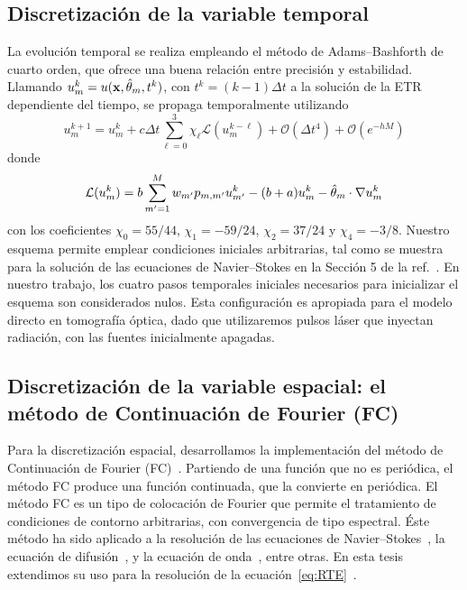 \subsection{Discretización de la variable temporal}
\label{sec:adamsbashforth}
La evolución temporal se realiza empleando el método de Adams--Bashforth de cuarto orden, 
que ofrece una 
buena relación entre precisión y estabilidad.
Llamando $u_m^k=u(\mathbf{x},\hat{\theta}_m,t^k)$, con $t^{k}=(k-1)\Delta t$ a la solución 
de la ETR 
dependiente del tiempo, se propaga temporalmente utilizando
\begin{equation}
u_m^{k+1} =  u_m^k + c\Delta t \sum_{\ell=0}^3 \chi_{\ell} \mathcal{L} ( u^{k-\ell}_m)  
+\mathcal{O}(\Delta t^4)+\mathcal{O}(e^{-hM})
\label{eq:RTEAB4}
\end{equation}
donde
\begin{equation}
\mathcal{L} ( u_m^k) = b\sum_{m'=1}^{M} w_{m'} p_{m,m'} u_{m'}^k-(b+a)u_m^k-\hat{\theta}_m \cdot \nabla u_m^k \notag
\label{eq:RTEAB4L}
\end{equation}
con los coeficientes $\chi_0=55/44$, 
$\chi_1=-59/24$, $\chi_2=37/24$ y $\chi_4=-3/8$. 
Nuestro esquema permite emplear condiciones iniciales arbitrarias, tal como se muestra para  
la solución de las ecuaciones de Navier--Stokes en la Sección 5 de la ref.~\cite{Bruno2016}.
En nuestro trabajo, los cuatro pasos temporales iniciales necesarios para inicializar 
el esquema son considerados nulos. Esta configuración es 
apropiada para 
el modelo directo en tomografía óptica, dado que utilizaremos pulsos láser 
que inyectan radiación, con las fuentes inicialmente apagadas. 

\subsection{Discretización de la variable espacial: el método de Continuación de Fourier (FC)}
\label{sec:fcmethod}
Para la discretización espacial, desarrollamos la implementación 
del método de Continuación de Fourier (FC)~\cite{Bruno2010,Albin2011,Amlani2016}.  
Partiendo de una función que no es periódica, el método FC produce 
una función continuada, que la convierte en periódica. 
El método FC es un tipo de colocación de Fourier que permite 
el tratamiento de condiciones de contorno arbitrarias, con 
convergencia de tipo espectral.
Éste método ha sido aplicado 
a la resolución de las ecuaciones de Navier--Stokes~\cite{Albin2011,Bruno2019}, la ecuación de difusión~\cite{Bruno2010}, 
y la ecuación de onda~\cite{Bruno2014}, entre otras. En esta tesis extendimos su uso  
para la resolución de la ecuación~\eqref{eq:RTE}~\cite{Gaggioli2019}.

